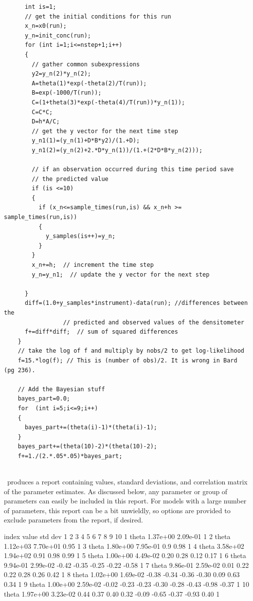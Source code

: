 \documentclass{admbmanual}
\begin{document}
\begin{lstlisting}
      int is=1;
      // get the initial conditions for this run
      x_n=x0(run);
      y_n=init_conc(run);
      for (int i=1;i<=nstep+1;i++)
      {
        // gather common subexpressions
        y2=y_n(2)*y_n(2);
        A=theta(1)*exp(-theta(2)/T(run));
        B=exp(-1000/T(run));
        C=(1+theta(3)*exp(-theta(4)/T(run))*y_n(1));
        C=C*C;
        D=h*A/C;
        // get the y vector for the next time step
        y_n1(1)=(y_n(1)+D*B*y2)/(1.+D);
        y_n1(2)=(y_n(2)+2.*D*y_n(1))/(1.+(2*D*B*y_n(2)));

        // if an observation occurred during this time period save
        // the predicted value
        if (is <=10)
        {
          if (x_n<=sample_times(run,is) && x_n+h >= sample_times(run,is))
          {
            y_samples(is++)=y_n;
          }
        }
        x_n+=h;  // increment the time step
        y_n=y_n1;  // update the y vector for the next step

      }
      diff=(1.0+y_samples*instrument)-data(run); //differences between the
                 // predicted and observed values of the densitometer 
      f+=diff*diff;  // sum of squared differences
    }
    // take the log of f and multiply by nobs/2 to get log-likelihood
    f=15.*log(f); // This is (number of obs)/2. It is wrong in Bard (pg 236).

    // Add the Bayesian stuff
    bayes_part=0.0;
    for  (int i=5;i<=9;i++)
    {
      bayes_part+=(theta(i)-1)*(theta(i)-1); 
    }
    bayes_part+=(theta(10)-2)*(theta(10)-2);
    f+=1./(2.*.05*.05)*bayes_part;
    
\end{lstlisting}

\ADM\ produces  a report containing values, standard deviations,
and correlation matrix of the parameter estimates. As discussed below,
any parameter or group of parameters can easily be included in this
report. For models with a large number of parameters, this report
can be a bit unwieldly, so options are provided to exclude parameters
from the report, if desired. 

\begin{smallcode}
 index          value   std dev     1     2     3     4     5     6     7     8     9     10   
    1   theta  1.37e+00 2.09e-01     1
    2   theta  1.12e+03 7.70e+01  0.95     1
    3   theta  1.80e+00 7.95e-01   0.9  0.98     1
    4   theta  3.58e+02 1.94e+02  0.91  0.98  0.99     1
    5   theta  1.00e+00 4.49e-02  0.20  0.28  0.12  0.17     1
    6   theta  9.94e-01 2.99e-02 -0.42 -0.35 -0.25 -0.22 -0.58     1
    7   theta  9.86e-01 2.59e-02  0.01  0.22  0.22  0.28  0.26  0.42     1
    8   theta  1.02e+00 1.69e-02 -0.38 -0.34 -0.36 -0.30  0.09  0.63  0.34     1
    9   theta  1.00e+00 2.59e-02 -0.02 -0.23 -0.23 -0.30 -0.28 -0.43 -0.98 -0.37     1
   10   theta  1.97e+00 3.23e-02  0.44  0.37  0.40  0.32 -0.09 -0.65 -0.37  -0.93  0.40    1
\end{smallcode}
\end{document}
